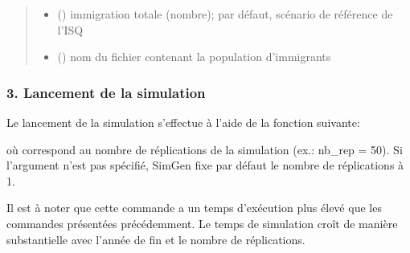 \documentclass[letterpaper,10pt,french]{sphinxmanual}
\begin{document}
\begin{fulllineitems}
\begin{fulllineitems}
\begin{quote}
\begin{description}
\begin{itemize}
\item {} 
 () \textendash{} immigration totale (nombre); par défaut, scénario de référence de l’ISQ

\item {} 
 () \textendash{} nom du fichier contenant la population d’immigrants

\end{itemize}

\end{description}\end{quote}

\end{fulllineitems}


\end{fulllineitems}


\begin{DUlineblock}{0em}
\item[] 
\end{DUlineblock}


\subsubsection{3. Lancement de la simulation}
\label{\detokenize{utilisation:lancement-de-la-simulation}}
Le lancement de la simulation s’effectue à l’aide de la fonction suivante:

\begin{sphinxVerbatim}[commandchars=\\\{\}]
\end{sphinxVerbatim}

où  correspond au nombre de réplications de la simulation (ex.: nb\_rep = 50). Si l’argument  n’est pas spécifié, SimGen fixe par défaut le nombre de réplications à 1.

Il est à noter que cette commande a un temps d’exécution plus élevé que les commandes présentées précédemment.
Le temps de simulation croît de manière substantielle avec l’année de fin et le nombre de réplications.

\end{document}
